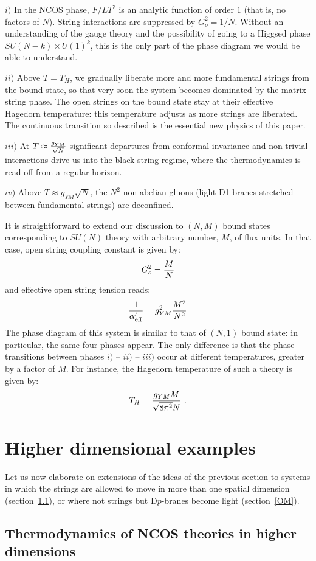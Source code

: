 $i)$ In the NCOS phase, $F/LT^2$ is an analytic function of 
order $1$ (that
is, no factors of $N$).  String interactions are suppressed by $G_o^2
= 1/N$.  Without an understanding of the gauge theory and the
possibility of going to a Higgsed phase $SU(N-k) \times U(1)^k$, this
is the only part of the phase diagram we would be able to understand.

$ii)$ Above $T=T_H$, we gradually liberate more and more fundamental
strings from the bound state, so that very soon the system becomes
dominated by the matrix string phase. The open strings on the bound state
stay at their effective Hagedorn temperature: this temperature
adjusts as more strings are liberated.  The continuous transition so
described is the essential new physics of this paper.

$iii)$ At $T \approx {g_{YM} \over \sqrt{N}}$ significant departures
from conformal invariance and non-trivial interactions drive us into
the black string regime, where the thermodynamics is read off from a
regular horizon.

$iv)$ Above $T \approx g_{YM} \sqrt{N}$, the $N^2$ non-abelian gluons
(light D1-branes stretched between fundamental strings) are deconfined.

It is straightforward to extend our discussion to $(N,M)$
bound states corresponding to $SU(N)$ theory with arbitrary
number, $M$, of flux units.
In that case, open string coupling constant is given by:
$$
G_o^2 = {M \over N}
$$
and effective open string tension reads:
$$
{1 \over \alpha'_{\rm eff}} = g_{YM}^2 {M^2 \over N^2}
$$
The phase diagram of this system is similar to that of $(N,1)$
bound state: in particular, the same four phases appear.
The only difference is that the phase transitions between phases
$i)$ -- $ii)$ -- $iii)$ occur at different temperatures,
greater by a factor of $M$.
For instance, the Hagedorn temperature of such a theory is given by:
$$
T_H = {g_{YM} M \over \sqrt{8 \pi^2} N}
\ .$$

\section{Higher dimensional examples}
\label{Others}

Let us now elaborate on extensions of the ideas of the previous
section to systems in which the strings are allowed to move in more
than one spatial dimension (section~\ref{Higher}), or where not
strings but D$p$-branes become light (section~\ref{OM}).


\subsection{Thermodynamics of NCOS theories in higher dimensions}
\label{Higher}

